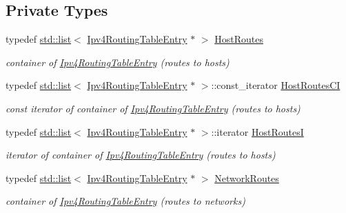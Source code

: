\subsection*{Private Types}
\begin{DoxyCompactItemize}
\item 
typedef \hyperlink{openflow-interface_8h_afd9bcfa176617760671b67580f536fa7}{std\+::list}$<$ \hyperlink{classns3_1_1Ipv4RoutingTableEntry}{Ipv4\+Routing\+Table\+Entry} $\ast$ $>$ \hyperlink{classns3_1_1Ipv4GlobalRouting_a08b1b12aa1fb8d95b67cefc785f0a235}{Host\+Routes}
\begin{DoxyCompactList}\small\item\em container of \hyperlink{classns3_1_1Ipv4RoutingTableEntry}{Ipv4\+Routing\+Table\+Entry} (routes to hosts) \end{DoxyCompactList}\item 
typedef \hyperlink{openflow-interface_8h_afd9bcfa176617760671b67580f536fa7}{std\+::list}$<$ \hyperlink{classns3_1_1Ipv4RoutingTableEntry}{Ipv4\+Routing\+Table\+Entry} $\ast$ $>$\+::const\+\_\+iterator \hyperlink{classns3_1_1Ipv4GlobalRouting_aae0bc92477a22c30a84d24b7059feba3}{Host\+Routes\+CI}
\begin{DoxyCompactList}\small\item\em const iterator of container of \hyperlink{classns3_1_1Ipv4RoutingTableEntry}{Ipv4\+Routing\+Table\+Entry} (routes to hosts) \end{DoxyCompactList}\item 
typedef \hyperlink{openflow-interface_8h_afd9bcfa176617760671b67580f536fa7}{std\+::list}$<$ \hyperlink{classns3_1_1Ipv4RoutingTableEntry}{Ipv4\+Routing\+Table\+Entry} $\ast$ $>$\+::iterator \hyperlink{classns3_1_1Ipv4GlobalRouting_a4a3de9839580400d39d5bac0b0d33308}{Host\+RoutesI}
\begin{DoxyCompactList}\small\item\em iterator of container of \hyperlink{classns3_1_1Ipv4RoutingTableEntry}{Ipv4\+Routing\+Table\+Entry} (routes to hosts) \end{DoxyCompactList}\item 
typedef \hyperlink{openflow-interface_8h_afd9bcfa176617760671b67580f536fa7}{std\+::list}$<$ \hyperlink{classns3_1_1Ipv4RoutingTableEntry}{Ipv4\+Routing\+Table\+Entry} $\ast$ $>$ \hyperlink{classns3_1_1Ipv4GlobalRouting_ab63c3f6778a619bb464078d9ee0112e9}{Network\+Routes}
\begin{DoxyCompactList}\small\item\em container of \hyperlink{classns3_1_1Ipv4RoutingTableEntry}{Ipv4\+Routing\+Table\+Entry} (routes to networks) \end{DoxyCompactList}\item 

\end{DoxyCompactItemize}
